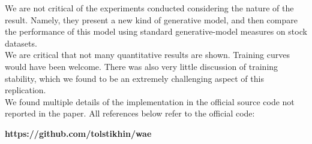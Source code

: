 \documentclass[12pt,english]{amsart}
\theoremstyle{definition}
\begin{document}
We are not critical of the experiments conducted considering the nature of the
result. Namely, they present a new kind of generative model, and then compare
the performance of this model using standard generative-model measures on stock
datasets. \\

We are critical that not many quantitative results are shown. Training curves
would have been welcome. There was also very little discussion of training
stability, which we found to be an extremely challenging aspect of this
replication. \\

We found multiple details of the implementation in the official source code
not reported in the paper. All references below refer to the official code: \\

\begin{center}\textbf{https://github.com/tolstikhin/wae}\end{center}\\
\end{document}
